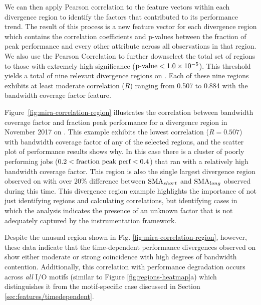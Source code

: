 We can then apply Pearson correlation to the feature vectors within
each divergence region to identify the factors that contributed to its
performance trend.  The result of this process is a new feature vector
for each divergence region which contains the correlation coefficients
and p-values between the fraction of peak performance and every other
attribute across all observations in that region.  We also use the Pearson
Correlation to further downselect the total set of regions to those 
with extremely high significance
($\textup{p-value} < {1.0 \times 10^{-5}}$).  This threshold yields a total
of nine relevant divergence regions on \mira \mirafsone.  Each of these nine
regions exhibits at least moderate correlation ($R$) ranging from 0.507 to
0.884 with the bandwidth coverage factor feature.


Figure~\ref{fig:mira-correlation-region} illustrates the correlation
between bandwidth coverage factor and fraction peak performance for a
divergence region in November 2017 on \mira \mirafsone.  This example
exhibits the lowest correlation ($R = 0.507$) with bandwidth coverage
factor of any of the selected regions, and the scatter plot of performance
results shows why.  In this case there is a cluster of poorly performing
jobs (${0.2 < \textup{fraction peak perf} < 0.4}$) that ran with a
relatively high bandwidth coverage factor.  This region is also the
single largest divergence region observed on \mira with over 20\%
difference between $\textup{SMA}_{short}$ and $\textup{SMA}_{long}$
observed during this time.  This divergence region example highlights the importance of not
just identifying regions and calculating correlations, but identifying cases
in which the analysis indicates the presence of an unknown factor that is
not adequately captured by the instrumentation framework.

Despite the unusual region shown in Fig. \ref{fig:mira-correlation-region},
however, these data indicate that the time-dependent performance divergences observed on \mira show either moderate or strong coincidence with high degrees of bandwidth contention.
Additionally, this correlation with performance degradation occurs across
\emph{all} I/O motifs (similar to Figure \ref{fig:regions-heatmap}a) which
distinguishes it from the motif-specific case discussed in Section
\ref{sec:features/timedependent}.  

